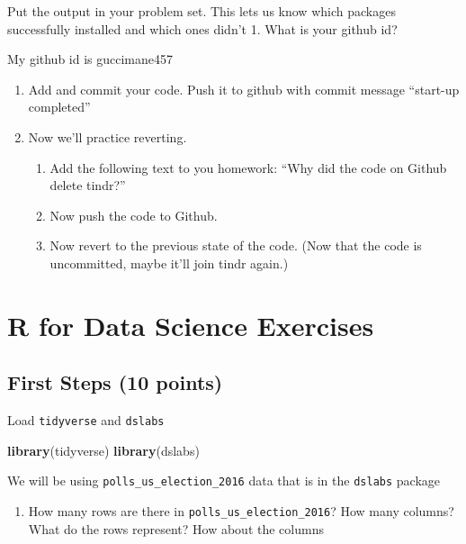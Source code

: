 \documentclass[
]{article}
\newenvironment{Shaded}{\begin{snugshade}}{\end{snugshade}}
\newcommand{\KeywordTok}[1]{\textcolor[rgb]{0.13,0.29,0.53}{\textbf{#1}}}
\newcommand{\NormalTok}[1]{#1}
\providecommand{\tightlist}{%
  \setlength{\itemsep}{0pt}\setlength{\parskip}{0pt}}
\begin{document}
Put the output in your problem set. This lets us know which packages
successfully installed and which ones didn't 1. What is your github id?

My github id is guccimane457

\begin{enumerate}
\def\labelenumi{\arabic{enumi}.}
\item
  Add and commit your code. Push it to github with commit message
  ``start-up completed''
\item
  Now we'll practice reverting.

  \begin{enumerate}
  \def\labelenumii{\alph{enumii}.}
  \tightlist
  \item
    Add the following text to you homework: ``Why did the code on Github
    delete tindr?''
  \item
    Now push the code to Github.
  \item
    Now revert to the previous state of the code. (Now that the code is
    uncommitted, maybe it'll join tindr again.)
  \end{enumerate}
\end{enumerate}

\hypertarget{r-for-data-science-exercises}{%
\section{R for Data Science
Exercises}\label{r-for-data-science-exercises}}

\hypertarget{first-steps-10-points}{%
\subsection{First Steps (10 points)}\label{first-steps-10-points}}

Load \texttt{tidyverse} and \texttt{dslabs}

\begin{Shaded}
\begin{Highlighting}[]
\KeywordTok{library}\NormalTok{(tidyverse)}
\KeywordTok{library}\NormalTok{(dslabs)}
\end{Highlighting}
\end{Shaded}

We will be using \texttt{polls\_us\_election\_2016} data that is in the
\texttt{dslabs} package

\begin{enumerate}
\def\labelenumi{\arabic{enumi}.}
\tightlist
\item
  How many rows are there in \texttt{polls\_us\_election\_2016}? How
  many columns? What do the rows represent? How about the columns
\end{enumerate}
\end{document}

